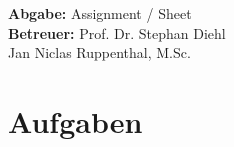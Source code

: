 \documentclass[11pt,a4paper]{article}
\title{\course}
\author{\studentname\\Matrikelnummer: \studentnumber\\\institute}
\date{\today}
\begin{document}
\maketitle

\begin{center}
    \textbf{Abgabe:} Assignment / Sheet \\
    \vspace{4mm}
    \textbf{Betreuer:} Prof. Dr. Stephan Diehl\\Jan Niclas Ruppenthal, M.Sc.
\end{center}

\bigskip

\section*{Aufgaben}
\end{document}
